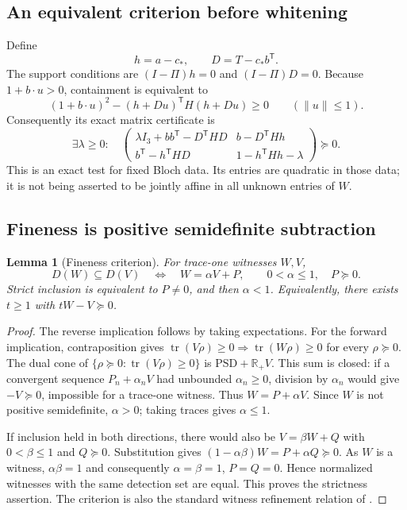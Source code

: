 \documentclass[11pt,a4paper]{article}
\newtheorem{lemma}[theorem]{Lemma}
\theoremstyle{definition}\newtheorem{definition}[theorem]{Definition}
\newcommand{\tr}{\operatorname{tr}}
\newcommand{\PSD}{\mathrm{PSD}}
\newcommand{\R}{\mathbb R}
\newcommand{\cstar}{c_*}
\theoremstyle{plain}\newtheorem*{theorem*}{Theorem}
\begin{document}
\subsection{An equivalent criterion before whitening}

Define
\[
 h=a-\cstar,\qquad D=T-\cstar b^{\mathsf T}.
\]
The support conditions are $(I-\Pi)h=0$ and $(I-\Pi)D=0$. Because $1+b\cdot u>0$, containment is equivalent to
\[
 (1+b\cdot u)^2-(h+Du)^{\mathsf T}H(h+Du)\geq0
 \qquad(\|u\|\leq1).
\]
Consequently its exact matrix certificate is
\begin{equation}\label{eq:raw-lmi}
 \exists\lambda\geq0:\quad
 \begin{pmatrix}
 \lambda I_3+bb^{\mathsf T}-D^{\mathsf T}HD&b-D^{\mathsf T}Hh\\
 b^{\mathsf T}-h^{\mathsf T}HD&1-h^{\mathsf T}Hh-\lambda
 \end{pmatrix}\succeq0.
\end{equation}
This is an exact test for fixed Bloch data. Its entries are quadratic in those data; it is not being asserted to be jointly affine in all unknown entries of $W$.

\subsection{Fineness is positive semidefinite subtraction}

\begin{lemma}[Fineness criterion]\label{lem:fine}
For trace-one witnesses $W,V$,
\begin{equation}\label{eq:fine}
 D(W)\subseteq D(V)
 \quad\Longleftrightarrow\quad
 W=\alpha V+P,\qquad 0<\alpha\leq1,\quad P\succeq0.
\end{equation}
Strict inclusion is equivalent to $P\neq0$, and then $\alpha<1$. Equivalently, there exists $t\geq1$ with $tW-V\succeq0$.
\end{lemma}
\begin{proof}
The reverse implication follows by taking expectations. For the forward implication, contraposition gives $\tr(V\rho)\geq0\Rightarrow\tr(W\rho)\geq0$ for every $\rho\succeq0$. The dual cone of $\{\rho\succeq0:\tr(V\rho)\geq0\}$ is $\PSD+\R_+V$. This sum is closed: if a convergent sequence $P_n+\alpha_nV$ had unbounded $\alpha_n\geq0$, division by $\alpha_n$ would give $-V\succeq0$, impossible for a trace-one witness. Thus $W=P+\alpha V$. Since $W$ is not positive semidefinite, $\alpha>0$; taking traces gives $\alpha\leq1$.

If inclusion held in both directions, there would also be $V=\beta W+Q$ with $0<\beta\leq1$ and $Q\succeq0$. Substitution gives $(1-\alpha\beta)W=P+\alpha Q\succeq0$. As $W$ is a witness, $\alpha\beta=1$ and consequently $\alpha=\beta=1$, $P=Q=0$. Hence normalized witnesses with the same detection set are equal. This proves the strictness assertion. The criterion is also the standard witness refinement relation of \cite{lewenstein}.
\end{proof}
\end{document}
